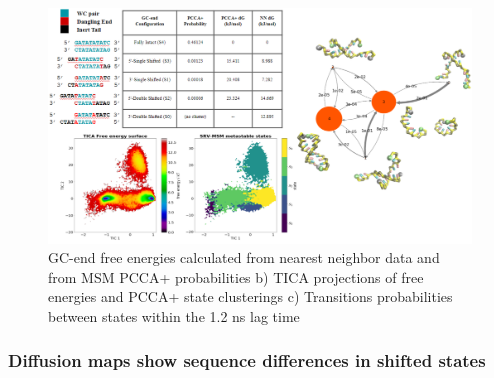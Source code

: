 \documentclass[journal=jpcbfk,manuscript=article]{achemso}
\begin{document}
\begin{figure}[ht!]
	\begin{center}
        \includegraphics[width=\textwidth]{Figs/figs_0804/GC-end_in_one.png}
        \caption{GC-end free energies calculated from nearest neighbor data and from MSM PCCA+ probabilities b) TICA projections of free energies and PCCA+ state clusterings c) Transitions probabilities between states within the 1.2 ns lag time}
        \label{fig:GC-end_in_one}
	\end{center}
\end{figure}

\subsubsection{Diffusion maps show sequence differences in shifted states}
\end{document}
